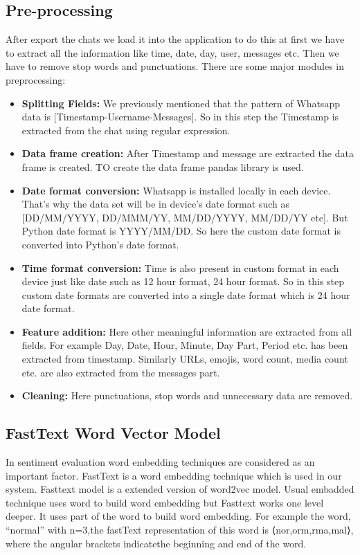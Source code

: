 \subsection{Pre-processing}
After export the chats we load it into the application to do this at first we have to extract all the information like time, date, day, user, messages etc. Then we have to remove stop words and punctuations. There are some major modules in preprocessing:
\begin{itemize}
\item \textbf{Splitting Fields:} We previously mentioned that the pattern of Whatsapp data is [Timestamp-Username-Messages]. So in this step the Timestamp is extracted from the chat using regular expression.

\item \textbf{Data frame creation:} After Timestamp and message are extracted the data frame is created. TO create the data frame pandas library is used.

\item \textbf{Date format conversion:} Whatsapp is installed locally in each device. That's why the data set will be in device's date format such as [DD/MM/YYYY, DD/MMM/YY, MM/DD/YYYY, MM/DD/YY etc]. But Python date format is YYYY/MM/DD. So here the custom date format is converted into Python's date format.

\item \textbf{Time format conversion:} Time is also present in custom format in each device just like date such as 12 hour format, 24 hour format. So in this step custom date formats are converted into a single date format which is 24 hour date format.
 
\item \textbf{Feature addition:} Here other meaningful information are extracted from all fields. For example Day, Date, Hour, Minute, Day Part, Period etc. has been extracted from timestamp. Similarly URLs, emojis, word count, media count etc. are also extracted from the messages part.
 
\item \textbf{Cleaning:} Here punctuations, stop words and unnecessary data are removed. 
\end{itemize}

\subsection{FastText Word Vector Model}
In sentiment evaluation word embedding techniques are considered as an important factor. FastText is a word embedding technique which is used in our system. Fasttext model is a extended version of word2vec model. Usual embadded technique uses word to build word embedding but Fasttext works one level deeper. It uses part of the word to build word embedding. For example the word, “normal” with n=3,the fastText representation of this word is ⟨nor,orm,rma,mal⟩, where the angular brackets indicatethe beginning and end of the word.

